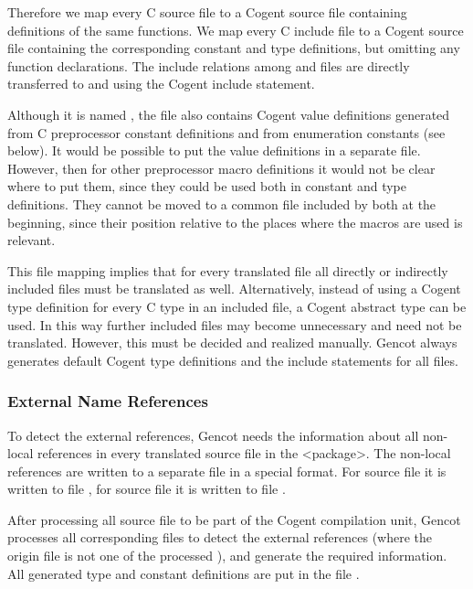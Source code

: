Therefore we map every C source file  to a Cogent source file  containing definitions of the same 
functions. We map every C include file  to a Cogent source file  
containing the corresponding constant and type definitions, but omitting any function declarations. The include relations among 
 and  files are directly transferred to  and  using the Cogent include
statement. 

Although it is named , the file also contains Cogent value definitions generated from C preprocessor
constant definitions and from enumeration constants (see below). It would be possible to put the value definitions in a 
separate file. However, then for other preprocessor macro definitions it would not be clear where to put them, since they could
be used both in constant and type definitions. They cannot be moved to a common file included by both at the beginning,
since their position relative to the places where the macros are used is relevant.

This file mapping implies that for every translated  file all directly or indirectly included  files must be 
translated as well.
Alternatively, instead of using a Cogent type definition for every C type in an included  file, a Cogent abstract type
can be used. In this way further included  files may become unnecessary and need not be translated. However, this
must be decided and realized manually. Gencot always generates default Cogent type definitions and the include statements for all
 files.

\subsubsection{External Name References}

To detect the external references, Gencot needs the information about all non-local references in every translated source 
file in the <package>. The non-local references are written to a separate file in a special format. For source file 
it is written to file , for source file  it is written to file . 

After processing all source file to be part of the Cogent compilation unit, Gencot processes all corresponding 
files to detect the external references (where the origin file is not one of the processed ), and generate
the required information. All generated type and constant definitions are put in the file .

